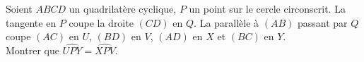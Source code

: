 Soient $ABCD$ un quadrilatère cyclique, $P$ un point sur le cercle circonscrit. La tangente en $P$ coupe la droite $(CD)$ en $Q$. La parallèle à $(AB)$ passant par $Q$ coupe $(AC)$ en $U$, $(BD)$ en $V$, $(AD)$ en $X$ et $(BC)$ en $Y$. \\
Montrer que $\widehat{UPY}=\widehat{XPV}$.